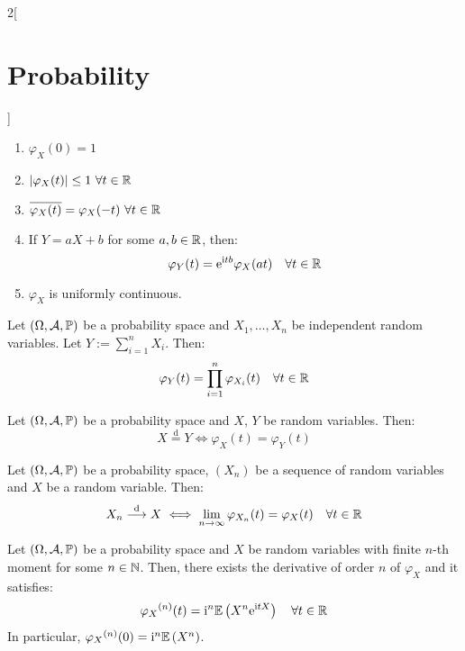 \documentclass[../../../main.tex]{subfiles}
\begin{document}
\begin{multicols}{2}[\section{Probability}]
\begin{proposition}
    \begin{enumerate}
      \item $\varphi_X(0)=1$
      \item $|\varphi_X(t)|\leq 1\ \forall t\in\mathbb{R}$
      \item $\overline{\varphi_X(t)}=\varphi_X(-t)\ \forall t\in\RR$
      \item If $Y=aX+b$ for some $a,b\in \mathbb{R}$, then: $$\varphi_Y(t)=\mathrm{e}^{\mathrm{i} t b}\varphi_X(at)\quad\forall t\in\mathbb{R}$$
      \item $\varphi_X$ is uniformly continuous.
    \end{enumerate}
  \end{proposition}
  \begin{theorem}
    Let $(\Omega,\mathcal{A},\mathbb{P})$ be a probability space and $X_1,\ldots,X_n$ be independent random variables. Let $Y:=\sum_{i=1}^n X_i$. Then: $$\varphi_Y(t)=\prod_{i=1}^n\varphi_{X_i}(t)\quad\forall t\in\mathbb{R}$$
  \end{theorem}
  \begin{theorem}
    Let $(\Omega,\mathcal{A},\mathbb{P})$ be a probability space and $X$, $Y$ be random variables. Then: $$X\overset{\text{d}}{=}Y\iff \varphi_X(t)=\varphi_Y(t)$$
  \end{theorem}
  \begin{theorem}
    Let $(\Omega,\mathcal{A},\mathbb{P})$ be a probability space, $(X_n)$ be a sequence of random variables and $X$ be a random variable. Then:
    $$X_n\overset{\text{d}}{\longrightarrow} X\iff\lim_{n\to\infty}\varphi_{X_n}(t)=\varphi_X(t)\quad\forall t\in\mathbb{R}$$
  \end{theorem}
  \begin{proposition}
    Let $(\Omega,\mathcal{A},\mathbb{P})$ be a probability space and $X$ be random variables with finite $n$-th moment for some $n\in\mathbb{N}$. Then, there exists the derivative of order $n$ of $\varphi_X$ and it satisfies: $${\varphi_X}^{(n)}(t)=\mathrm{i}^n\mathbb{E}\left(X^n\mathrm{e}^{\mathrm{i} t X}\right)\quad\forall t\in\mathbb{R}$$ In particular, ${\varphi_X}^{(n)}(0)=\mathrm{i}^n\mathbb{E}\left(X^n\right)$.
  \end{proposition}

\end{multicols}
\end{document}

